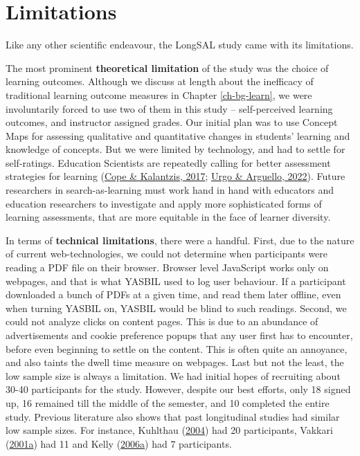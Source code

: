 \documentclass[letterpaper, nobind]{templates/ociamthesis}
\begin{document}
\hypertarget{limitations}{%
\section{Limitations}\label{limitations}}

Like any other scientific endeavour, the LongSAL study came with its limitations.

The most prominent \textbf{theoretical limitation} of the study was the choice of learning outcomes.
Although we discuss at length about the inefficacy of traditional learning outcome measures in Chapter \ref{ch-bg-learn}, we were involuntarily forced to use two of them in this study -- self-perceived learning outcomes, and instructor assigned grades.
Our initial plan was to use Concept Maps for assessing qualitative and quantitative changes in students' learning and knowledge of concepts.
But we were limited by technology, and had to settle for self-ratings.
Education Scientists are repeatedly calling for better assessment strategies for learning (\protect\hyperlink{ref-cope2017elearningc}{Cope \& Kalantzis, 2017}; \protect\hyperlink{ref-urgo2022learning}{Urgo \& Arguello, 2022}).
Future researchers in search-as-learning must work hand in hand with educators and education researchers to investigate and apply more sophisticated forms of learning assessments, that are more equitable in the face of learner diversity.

In terms of \textbf{technical limitations}, there were a handful.
First, due to the nature of current web-technologies, we could not determine when participants were reading a PDF file on their browser.
Browser level JavaScript works only on webpages, and that is what YASBIL used to log user behaviour.
If a participant downloaded a bunch of PDFs at a given time, and read them later offline, even when turning YASBIL on, YASBIL would be blind to such readings.
Second, we could not analyze clicks on content pages. This is due to an abundance of advertisements and cookie preference popups that any user first has to encounter, before even beginning to settle on the content. This is often quite an annoyance, and also taints the dwell time measure on webpages.
Last but not the least, the low sample size is always a limitation.
We had initial hopes of recruiting about 30-40 participants for the study.
However, despite our best efforts, only 18 signed up, 16 remained till the middle of the semester, and 10 completed the entire study.
Previous literature also shows that past longitudinal studies had similar low sample sizes.
For instance, Kuhlthau (\protect\hyperlink{ref-kuhlthau2004seeking}{2004}) had 20 participants, Vakkari (\protect\hyperlink{ref-vakkari2001changes}{2001a}) had 11 and Kelly (\protect\hyperlink{ref-kelly2006measuringa}{2006a}) had 7 participants.
\end{document}
